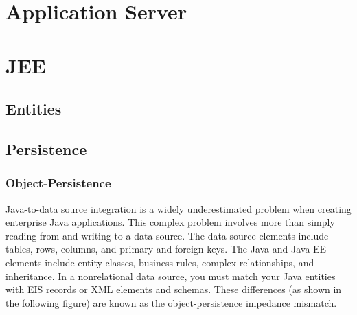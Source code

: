 
\section{Application Server}

\section{JEE}
\subsection{Entities}
\subsection{Persistence}
\subsubsection{Object-Persistence}
Java-to-data source integration is a widely underestimated problem when creating enterprise Java applications. This complex problem involves more than simply reading from and writing to a data source. The data source elements include tables, rows, columns, and primary and foreign keys. The Java and Java EE elements include entity classes, business rules, complex relationships, and inheritance. In a nonrelational data source, you must match your Java entities with EIS records or XML elements and schemas. These differences (as shown in the following figure) are known as the object-persistence impedance mismatch.

